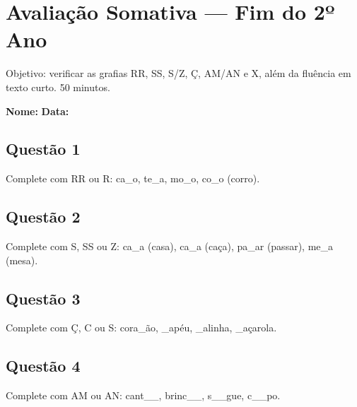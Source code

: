 \clearpage

\section{Avaliação Somativa — Fim do 2º Ano}

\begin{avaliacao}
Objetivo: verificar as grafias RR, SS, S/Z, Ç, AM/AN e X, além da fluência em texto curto. 50 minutos.
\end{avaliacao}

\noindent\textbf{Nome:} \underline{\hspace{4cm}} \quad \textbf{Data:} \underline{\hspace{2cm}}

\subsection*{Questão 1}
Complete com RR ou R: ca\_o, te\_a, mo\_o, co\_o (corro).

\begin{center}
  \underline{\hspace{12cm}}
\end{center}

\subsection*{Questão 2}
Complete com S, SS ou Z: ca\_a (casa), ca\_a (caça), pa\_ar (passar), me\_a (mesa).

\begin{center}
  \underline{\hspace{12cm}}
\end{center}

\subsection*{Questão 3}
Complete com Ç, C ou S: cora\_ão, \_apéu, \_alinha, \_açarola.

\begin{center}
  \underline{\hspace{12cm}}
\end{center}

\subsection*{Questão 4}
Complete com AM ou AN: cant\_\_, brinc\_\_, s\_\_gue, c\_\_po.

\begin{center}
  \underline{\hspace{12cm}}
\end{center}

